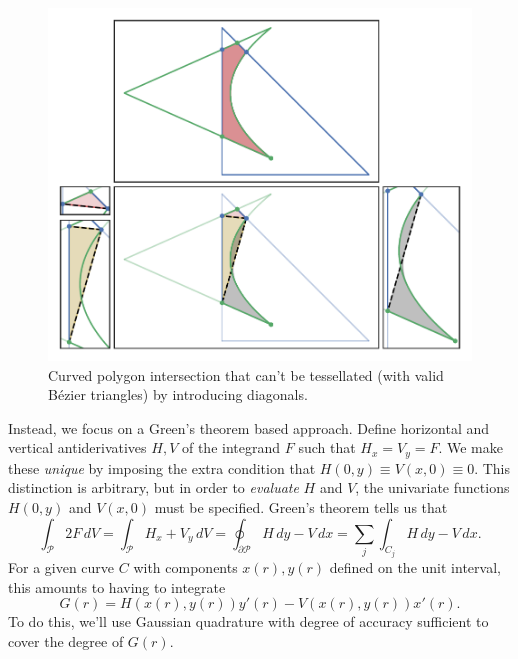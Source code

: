 \begin{figure}
  \includegraphics{../images/curved-mesh/main_figure16.pdf}
  \centering
  \captionsetup{width=.75\linewidth}
  \caption{Curved polygon intersection that can't be tessellated
    (with valid B\'{e}zier triangles) by introducing diagonals.}
  \label{fig:bad-tessellation-required}
\end{figure}

Instead, we focus on a Green's theorem based approach.
Define horizontal and vertical antiderivatives
\(H, V\) of the integrand \(F\) such that \(H_x = V_y = F\).
We make these \textit{unique} by imposing the
extra condition that \(H(0, y) \equiv V(x, 0) \equiv 0\).
This distinction is arbitrary, but in order to \textit{evaluate}
\(H\) and \(V\), the univariate functions \(H(0, y)\) and \(V(x, 0)\)
must be specified.
Green's theorem tells us that
\begin{equation}
\int_{\mathcal{P}} 2 F \, dV =
\int_{\mathcal{P}} H_x + V_y \, dV =
\oint_{\partial \mathcal{P}} H \, dy - V \, dx =
\sum_j \int_{C_j} H \, dy - V \, dx.
\end{equation}
For a given curve \(C\) with components \(x(r), y(r)\)
defined on the unit interval, this amounts to having
to integrate
\begin{equation}
G(r) = H(x(r), y(r)) y'(r) - V(x(r), y(r)) x'(r).
\end{equation}
To do this, we'll use Gaussian
quadrature with degree of accuracy sufficient to cover the degree
of \(G(r)\).

